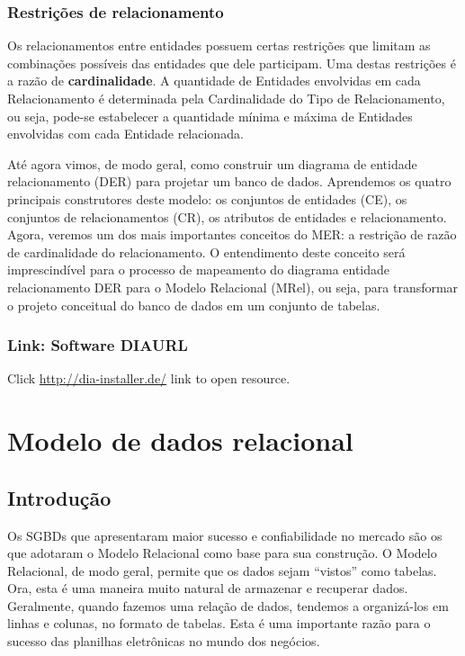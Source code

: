 \documentclass{article}
\begin{document}
\subsubsection*{Restrições de relacionamento}
Os relacionamentos entre entidades possuem certas restrições que limitam as combinações possíveis das entidades que dele participam. Uma destas restrições é a razão de \textbf{cardinalidade}. A quantidade de Entidades envolvidas em cada Relacionamento é determinada pela Cardinalidade do Tipo de Relacionamento, ou seja, pode-se estabelecer a quantidade mínima e máxima de Entidades envolvidas com cada Entidade relacionada.

Até agora vimos, de modo geral, como construir um diagrama de entidade relacionamento (DER) para projetar um banco de dados. Aprendemos os quatro principais construtores deste modelo: os conjuntos de entidades (CE), os conjuntos de relacionamentos (CR), os atributos de entidades e relacionamento. Agora, veremos um dos mais importantes conceitos do MER: a restrição de razão de cardinalidade do relacionamento. O entendimento deste conceito será imprescindível para o processo de mapeamento do diagrama entidade relacionamento DER para o Modelo Relacional (MRel), ou seja, para transformar o projeto conceitual do banco de dados em um conjunto de tabelas.

\subsubsection{Link: Software DIAURL}
Click \href{http://dia-installer.de/}{http://dia-installer.de/} link to open resource.

\section{Modelo de dados relacional}
\subsection{Introdução}
Os SGBDs que apresentaram maior sucesso e confiabilidade no mercado são os que adotaram o Modelo Relacional como base para sua construção. O Modelo Relacional, de modo geral, permite que os dados sejam “vistos” como tabelas. Ora, esta é uma maneira muito natural de armazenar e recuperar dados. Geralmente, quando fazemos uma relação de dados, tendemos a organizá-los em linhas e colunas, no formato de tabelas. Esta é uma importante razão para o sucesso das planilhas eletrônicas no mundo dos negócios.
\end{document}
